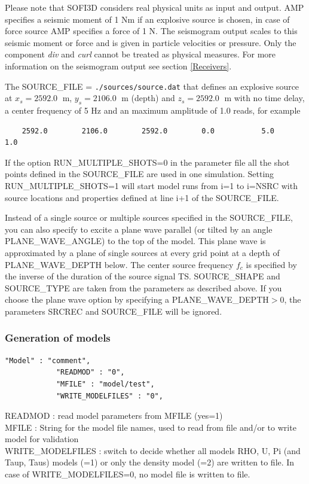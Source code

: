 \documentclass[11pt,onecolumn,oneside]{article}
\begin{document}
Please note that SOFI3D considers real physical units as input and output. AMP specifies a seismic moment of 1 Nm if an explosive source is chosen, in case of force source AMP specifies a force of 1 N. The seismogram output scales to this seismic moment or force and is given in particle velocities or pressure. Only the component \textit{div} and \textit{curl} cannot be treated as physical measures. For more information on the seismogram output see section \ref{Receivers}.

The  SOURCE\_FILE =  \lstinline{./sources/source.dat} that defines an explosive source  at $x_s=2592.0\;$ m, $y_s=2106.0\;$ m (depth) and $z_s=2592.0\;$ m  with no time delay,
a center frequency of 5 Hz  and an maximum amplitude of 1.0 reads, for example
\begin{verbatim}
	2592.0        2106.0        2592.0        0.0           5.0           1.0
\end{verbatim}

If the option RUN\_MULTIPLE\_SHOTS=0 in the parameter file all the shot points defined in the SOURCE\_FILE are used in one simulation. Setting RUN\_MULTIPLE\_SHOTS=1 will start model runs 
from i=1 to i=NSRC with source locations and properties defined at line i+1 of the SOURCE\_FILE. 

Instead of a single source or multiple sources specified in the SOURCE\_FILE, you can also specify to excite a plane wave parallel (or tilted by an angle PLANE\_WAVE\_ANGLE) to the top of the model. This plane wave is approximated by a plane of single sources at every grid point at a depth of PLANE\_WAVE\_DEPTH below. The center source frequency $f_c$ is specified by the inverse of the duration of the source signal TS. SOURCE\_SHAPE and SOURCE\_TYPE are taken from the parameters as described above. If you choose the plane wave option by specifying a PLANE\_WAVE\_DEPTH$>$0, the parameters SRCREC and SOURCE\_FILE will be ignored.

\subsubsection{Generation of models}
\label{gen_of_mod}
\begin{verbatim}
"Model" : "comment",
			"READMOD" : "0",
			"MFILE" : "model/test",
			"WRITE_MODELFILES" : "0",

\end{verbatim}

READMOD : read model parameters from MFILE (yes=1)\\
MFILE : String for the model file names, used to read from file and/or to write model for validation \\
WRITE\_MODELFILES : switch to decide whether all models RHO, U, Pi (and Taup, Taus) models (=1) or only the density model (=2) are written to file. In case of WRITE\_MODELFILES=0, no model file is written to file.
\end{document}
